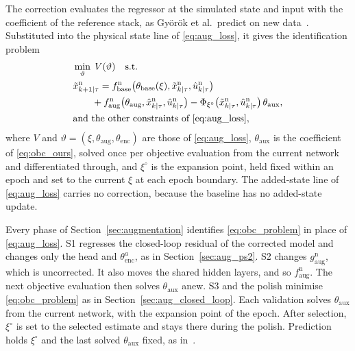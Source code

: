 The correction evaluates the regressor at the simulated state and input with
the coefficient of the reference stack, as Gy\"or\"ok et al.\ predict on new
data~\cite[Eq.~(13)]{gyorok2026obc}.
Substituted into the physical state line of \eqref{eq:aug_loss}, it gives the
identification problem
\begin{equation}
\begin{aligned}
 &\min_{\vartheta}\;V(\vartheta)\quad\text{s.t.}\\
 &\tilde x^{\mathrm n}_{k+1|\tau}
  =f^{\mathrm n}_{\mathrm{base}}\bigl(\theta_{\mathrm{base}}(\xi),
   \tilde x^{\mathrm n}_{k|\tau},\hat u^{\mathrm n}_{k|\tau}\bigr)\\
 &\qquad+f^{\mathrm n}_{\mathrm{aug}}\bigl(\theta_{\mathrm{aug}},
   \hat x^{\mathrm n}_{k|\tau},\hat u^{\mathrm n}_{k|\tau}\bigr)
  -\Phi_{\xi^\circ}\bigl(\tilde x^{\mathrm n}_{k|\tau},
   \hat u^{\mathrm n}_{k|\tau}\bigr)\,\theta_{\mathrm{aux}},\\
 &\text{and the other constraints of \eqref{eq:aug_loss}},
\end{aligned}
\label{eq:obc_problem}
\end{equation}
where $V$ and $\vartheta=(\xi,\theta_{\mathrm{aug}},\theta_{\mathrm{enc}})$ are
those of \eqref{eq:aug_loss}, $\theta_{\mathrm{aux}}$ is the coefficient of
\eqref{eq:obc_ours}, solved once per objective evaluation from the current
network and differentiated through, and $\xi^\circ$ is the expansion point,
held fixed within an epoch and set to the current $\xi$ at each epoch
boundary.
The added-state line of \eqref{eq:aug_loss} carries no correction, because the
baseline has no added-state update.

Every phase of Section~\ref{sec:augmentation} identifies
\eqref{eq:obc_problem} in place of \eqref{eq:aug_loss}.
S1 regresses the closed-loop residual of the corrected model and changes only
the head and $\theta^a_{\mathrm{enc}}$, as in Section~\ref{sec:aug_ps2}.
S2 changes $g^{\mathrm n}_{\mathrm{aug}}$, which is uncorrected.
It also moves the shared hidden layers, and so $f^{\mathrm n}_{\mathrm{aug}}$.
The next objective evaluation then solves $\theta_{\mathrm{aux}}$ anew.
S3 and the polish minimise \eqref{eq:obc_problem} as in
Section~\ref{sec:aug_closed_loop}.
Each validation solves $\theta_{\mathrm{aux}}$ from the current network, with
the expansion point of the epoch.
After selection, $\xi^\circ$ is set to the selected estimate and stays there
during the polish.
Prediction holds $\xi^\circ$ and the last solved $\theta_{\mathrm{aux}}$ fixed,
as in~\cite[Eq.~(13)]{gyorok2026obc}.

